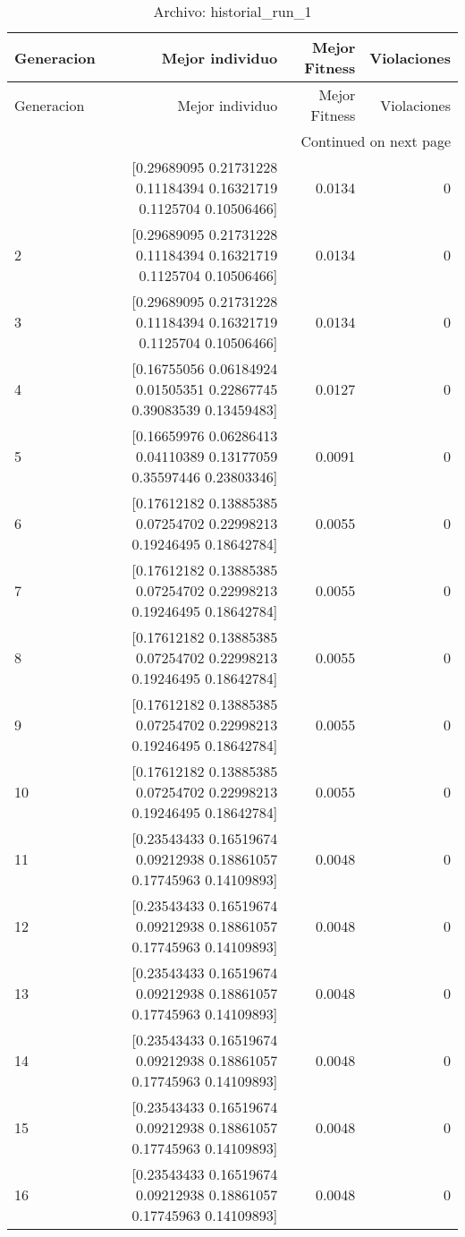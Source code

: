 \begin{longtable}{lrrr}
\caption{Archivo: historial\_run\_1}\label{tab:historial_run_1} \\
\toprule
Generacion & Mejor individuo & Mejor Fitness & Violaciones \\
\midrule
\endfirsthead
\toprule
Generacion & Mejor individuo & Mejor Fitness & Violaciones \\
\midrule
\endhead
\midrule
\multicolumn{4}{r}{Continued on next page} \\
\midrule
\endfoot
\bottomrule
\endlastfoot
1 & [0.29689095 0.21731228 0.11184394 0.16321719 0.1125704  0.10506466] & 0.0134 & 0 \\
2 & [0.29689095 0.21731228 0.11184394 0.16321719 0.1125704  0.10506466] & 0.0134 & 0 \\
3 & [0.29689095 0.21731228 0.11184394 0.16321719 0.1125704  0.10506466] & 0.0134 & 0 \\
4 & [0.16755056 0.06184924 0.01505351 0.22867745 0.39083539 0.13459483] & 0.0127 & 0 \\
5 & [0.16659976 0.06286413 0.04110389 0.13177059 0.35597446 0.23803346] & 0.0091 & 0 \\
6 & [0.17612182 0.13885385 0.07254702 0.22998213 0.19246495 0.18642784] & 0.0055 & 0 \\
7 & [0.17612182 0.13885385 0.07254702 0.22998213 0.19246495 0.18642784] & 0.0055 & 0 \\
8 & [0.17612182 0.13885385 0.07254702 0.22998213 0.19246495 0.18642784] & 0.0055 & 0 \\
9 & [0.17612182 0.13885385 0.07254702 0.22998213 0.19246495 0.18642784] & 0.0055 & 0 \\
10 & [0.17612182 0.13885385 0.07254702 0.22998213 0.19246495 0.18642784] & 0.0055 & 0 \\
11 & [0.23543433 0.16519674 0.09212938 0.18861057 0.17745963 0.14109893] & 0.0048 & 0 \\
12 & [0.23543433 0.16519674 0.09212938 0.18861057 0.17745963 0.14109893] & 0.0048 & 0 \\
13 & [0.23543433 0.16519674 0.09212938 0.18861057 0.17745963 0.14109893] & 0.0048 & 0 \\
14 & [0.23543433 0.16519674 0.09212938 0.18861057 0.17745963 0.14109893] & 0.0048 & 0 \\
15 & [0.23543433 0.16519674 0.09212938 0.18861057 0.17745963 0.14109893] & 0.0048 & 0 \\
16 & [0.23543433 0.16519674 0.09212938 0.18861057 0.17745963 0.14109893] & 0.0048 & 0 \\

\end{longtable}
